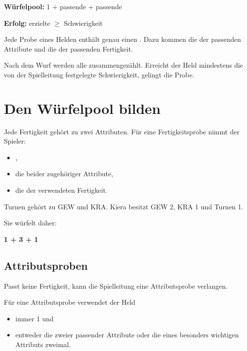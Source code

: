 \begin{kurzregel}[title=Grundregel einer Probe]
\textbf{Würfelpool:} 1\heroDie{} + passende \greenDie{} + passende \blueDie

\textbf{Erfolg:} erzielte \star{} $\geq$ Schwierigkeit
\end{kurzregel}

Jede Probe eines Helden enthält genau einen \heroDie. Dazu kommen die \greenDie{} der passenden Attribute und die \blueDie{} der passenden Fertigkeit.

Nach dem Wurf werden alle \star{} zusammengezählt. Erreicht der Held mindestens die von der Spielleitung festgelegte Schwierigkeit, gelingt die Probe.

\section{Den Würfelpool bilden}

Jede Fertigkeit gehört zu zwei Attributen. Für eine Fertigkeitsprobe nimmt der Spieler:

\begin{itemize}
  \item \heroDie,
  \item die \greenDie{} beider zugehöriger Attribute,
  \item die \blueDie{} der verwendeten Fertigkeit.
\end{itemize}

\begin{beispiel}[title=Würfelpool einer Fertigkeitsprobe]
Turnen gehört zu GEW und KRA. Kiera besitzt GEW 2, KRA 1 und Turnen 1.

Sie würfelt daher:

\textbf{1\heroDie{} + 3\greenDie{} + 1\blueDie}
\end{beispiel}

\subsection{Attributsproben}

Passt keine Fertigkeit, kann die Spielleitung eine Attributsprobe verlangen.

\begin{kurzregel}[title=Attributsprobe]
Für eine Attributsprobe verwendet der Held
\begin{itemize}
  \item immer 1\heroDie{} und
  \item entweder die \greenDie{} zweier passender Attribute oder die \greenDie{} eines besonders wichtigen Attributs zweimal.
\end{itemize}
\end{kurzregel}

